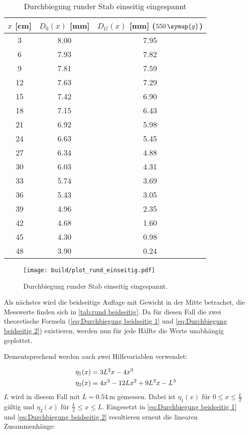 \begin{table} [H]
  \centering
  \caption{Durchbiegung runder Stab einseitig eingespannt}
  \label{tab:rund einseitig}
  \begin{tabular}{S[table-format=2.0] S[table-format=2.0] S[table-format=2.0]}
    \toprule
    {$x$ [cm]} & {$D_{0}(x)$ [mm]} & {$D_{G}(x)$ [mm] ($550\,\symup{g}$)} \\
     & 8.00 & 7.95 \\
     6 & 7.93 & 7.82 \\
     9 & 7.81 & 7.59 \\
    12 & 7.63 & 7.29 \\
    15 & 7.42 & 6.90 \\ 
    18 & 7.15 & 6.43 \\
    21 & 6.92 & 5.98 \\
    24 & 6.63 & 5.45 \\
    27 & 6.34 & 4.88 \\
    30 & 6.03 & 4.31 \\
    33 & 5.74 & 3.69 \\
    36 & 5.43 & 3.05 \\
    39 & 4.96 & 2.35 \\
    42 & 4.68 & 1.60 \\
    45 & 4.30 & 0.98 \\
    48 & 3.90 & 0.24 \\ 
    \bottomrule
  \end{tabular}
\end{table}

\begin{figure} [H]
  \centering
  \texttt{[image: build/plot\_rund\_einseitig.pdf]}
  \caption{Durchbiegung runder Stab einseitig eingespannt.}
  \label{fig:rund_einseitig}
\end{figure}

Als nächstes wird die beidseitige Auflage mit Gewicht in der Mitte betrachet,
die Messwerte finden sich in \autoref{tab:rund beidseitig}.
Da für diesen Fall die zwei theoretische Formeln (\autoref{eq:Durchbiegung beidseitig 1} und \autoref{eq:Durchbiegung beidseitig 2}) existieren,
werden nun für jede Hälfte die Werte unabhängig geplottet.

Dementsprechend werden auch zwei Hilfsvariablen verwendet:

\begin{align}
  \eta_{1}(x)&=3L^{2}x-4x^{3}  \notag \\
  \eta_{2}(x)&=4x^{3}-12Lx^{2}+9L^{2}x-L^{3} \notag
\end{align}
$L$ wird in diesem Fall mit $L=\qty{0,54}{\metre}$ gemessen.
Dabei ist $\eta_{1}(x)$ für $0\leq x\leq \frac{L}{2}$ gültig und $\eta_{2}(x)$ für $\frac{L}{2}\leq x\leq L$.
Eingesetzt in \autoref{eq:Durchbiegung beidseitig 1} und \autoref{eq:Durchbiegung beidseitig 2}
resultieren erneut die linearen Zusammenhänge:

